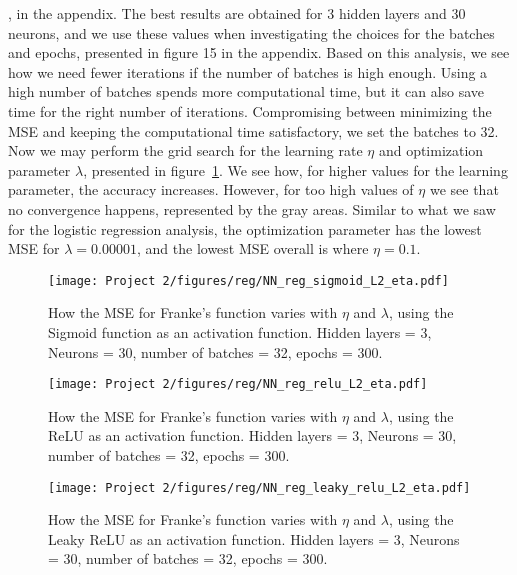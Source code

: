 \documentclass[english,notitlepage,reprint,nofootinbib]{revtex4-2}  %
\begin{document}
, in the appendix. 
The best results are obtained for 3 hidden layers and 30 neurons, and we use these values when investigating the choices for the batches and epochs, presented in figure 15
in the appendix. Based on this analysis, we see how we need fewer iterations if the number of batches is high enough. Using a high number of batches spends more computational time, but it can also save time for the right number of iterations. Compromising between minimizing the MSE and keeping the computational time satisfactory, we set the batches to 32. 
\vspace{3mm}
\\ 
Now we may perform the grid search for the learning rate $\eta$ and optimization parameter $\lambda$, presented in figure~\ref{fig: b_sigmoid_3}. We see how, for higher values for the learning parameter, the accuracy increases. However, for too high values of $\eta$ we see that no convergence happens, represented by the gray areas. Similar to what we saw for the logistic regression analysis, the optimization parameter has the lowest MSE for $\lambda = 0.00001$, and the lowest MSE overall is where $\eta=0.1$. 
\begin{figure}[h!]
    \centering %
    \texttt{[image: Project 2/figures/reg/NN\_reg\_sigmoid\_L2\_eta.pdf]} 
    \caption{How the MSE for Franke's function varies with $\eta$ and $\lambda$, using the Sigmoid function as an activation function. 
    Hidden layers = 3, Neurons = 30, number of batches = 32, epochs = 300.}
    \label{fig: b_sigmoid_3}
\end{figure}
\begin{figure}[h!]
    \centering %
    \texttt{[image: Project 2/figures/reg/NN\_reg\_relu\_L2\_eta.pdf]} 
    \caption{How the MSE for Franke's function varies with $\eta$ and $\lambda$, using the ReLU as an activation function. 
    Hidden layers = 3, Neurons = 30, number of batches = 32, epochs = 300.}
    \label{fig: b_relu}
\end{figure}
\begin{figure}[h!]
    \centering %
    \texttt{[image: Project 2/figures/reg/NN\_reg\_leaky\_relu\_L2\_eta.pdf]} 
    \caption{How the MSE for Franke's function varies with $\eta$ and $\lambda$, using the Leaky ReLU as an activation function. 
    Hidden layers = 3, Neurons = 30, number of batches = 32, epochs = 300.}
    \label{fig: b_lrelu}
\end{figure}
\end{document}
